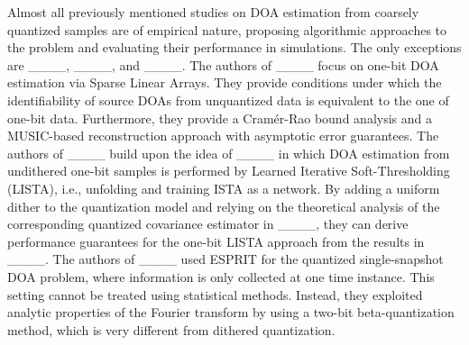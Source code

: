 Almost all previously mentioned studies on DOA estimation from coarsely quantized samples are of empirical nature, proposing algorithmic approaches to the problem and evaluating their performance in simulations. The only exceptions are ____, ____, and ____. The authors of ____ focus on one-bit DOA estimation via Sparse Linear Arrays. They provide conditions under which the identifiability of source DOAs from unquantized data is equivalent to the one of one-bit data. Furthermore, they provide a Cramér-Rao bound analysis and a MUSIC-based reconstruction approach with asymptotic error guarantees. The authors of ____ build upon the idea of ____ in which DOA estimation from undithered one-bit samples is performed by Learned Iterative Soft-Thresholding (LISTA), i.e., unfolding and training ISTA as a network. By adding a uniform dither to the quantization model and relying on the theoretical analysis of the corresponding quantized covariance estimator in ____, they can derive performance guarantees for the one-bit LISTA approach from the results in ____. The authors of ____ used ESPRIT for the quantized single-snapshot DOA problem, where information is only collected at one time instance. This setting cannot be treated using statistical methods. Instead, they exploited analytic properties of the Fourier transform by using a two-bit beta-quantization method, which is very different from dithered quantization.